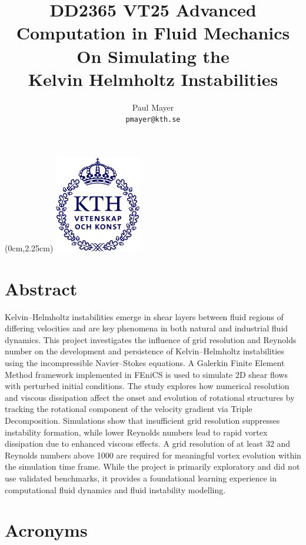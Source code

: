 \documentclass[a4paper,12pt]{article}
\title{
  \vspace{6cm}
  \normalsize{DD2365 VT25 Advanced}\\
  \normalsize{Computation in Fluid Mechanics}\\
  \Large{On Simulating the}\\
  \Large{Kelvin Helmholtz Instabilities}
}
\author{
  \small Paul Mayer\\[-0.75ex]
  \scriptsize\texttt{pmayer@kth.se}
}
\date{}
\begin{document}
\begin{textblock*}{\paperwidth}(0cm,2.25cm)
    \centering 
    \includegraphics[width=3.75cm]{assets/kthlogo.png}
\end{textblock*}

\maketitle
%

\section*{Abstract}
Kelvin–Helmholtz instabilities emerge in shear layers between fluid regions of differing velocities and are key phenomena in both natural and industrial fluid dynamics. This project investigates the influence of grid resolution and Reynolds number on the development and persistence of Kelvin–Helmholtz instabilities using the incompressible Navier–Stokes equations. A Galerkin Finite Element Method framework implemented in FEniCS is used to simulate 2D shear flows with perturbed initial conditions.
The study explores how numerical resolution and viscous dissipation affect the onset and evolution of rotational structures by tracking the rotational component of the velocity gradient via Triple Decomposition.
Simulations show that insufficient grid resolution suppresses instability formation, while lower Reynolds numbers lead to rapid vortex dissipation due to enhanced viscous effects.
A grid resolution of at least 32 and Reynolds numbers above 1000 are required for meaningful vortex evolution within the simulation time frame.
While the project is primarily exploratory and did not use validated benchmarks, it provides a foundational learning experience in computational fluid dynamics and fluid instability modelling.
\newpage

\tableofcontents

\section*{Acronyms}
\begin{acronym}
\end{acronym}
\newpage
\end{document}
